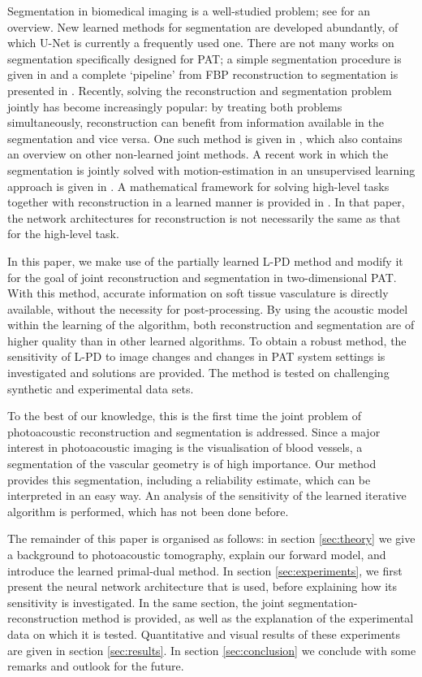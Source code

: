 \documentclass[journal]{IEEEtran}
\newcommand{\hl}[1]{#1}
\begin{document}
Segmentation in biomedical imaging is a well-studied problem; see \cite{Acton2009} for an overview. New learned methods for segmentation are developed abundantly, of which U-Net \cite{Ronneberger2015} is currently a frequently used one. There are not many works on segmentation specifically designed for PAT; a simple segmentation procedure is given in \cite{Soetikno2012} and a complete `pipeline' from FBP reconstruction to segmentation is presented in \cite{Raumonen2018}. Recently, solving the reconstruction and segmentation problem jointly has become increasingly popular: by treating both problems simultaneously, reconstruction can benefit from information available in the segmentation and vice versa. One such method is given in \cite{Corona2018}, which also contains an overview on other non-learned joint methods. A recent work in which the segmentation is jointly solved with motion-estimation in an unsupervised learning approach is given in \cite{Qin2018}. \hl{A mathematical framework for solving high-level tasks together with reconstruction in a learned manner is provided in \cite{Adler2018b}. In that paper, the network architectures for reconstruction is not necessarily the same as that for the high-level task. }

In this paper, we make use of the partially learned L-PD method and modify it for the goal of joint reconstruction and segmentation in {two-dimensional} PAT. With this method, accurate information on soft tissue vasculature is directly available, without the necessity for post-processing. By using the acoustic model within the learning of the algorithm, both reconstruction and segmentation are of higher quality than in other learned algorithms. To obtain a robust method, the sensitivity of L-PD to image changes and changes in PAT system settings is investigated and solutions are provided. The method is tested on challenging synthetic and experimental data sets. 

To the best of our knowledge, this is the first time the joint problem of photoacoustic reconstruction and segmentation is addressed. Since a major interest in photoacoustic imaging is the visualisation of blood vessels, a segmentation of the vascular geometry is of high importance. Our method provides this segmentation, including a reliability estimate, which can be interpreted in an easy way. An analysis of the sensitivity of the learned iterative algorithm is performed, which has not been done before.

The remainder of this paper is organised as follows: in section \ref{sec:theory} we give a background to photoacoustic tomography, explain our forward model, and introduce the learned primal-dual method. In section \ref{sec:experiments}, we first present the neural network architecture that is used, before explaining how its sensitivity is investigated. In the same section, the joint segmentation-reconstruction method is provided, as well as the explanation of the experimental data on which it is tested. Quantitative and visual results of these experiments are given in section \ref{sec:results}. In section \ref{sec:conclusion} we conclude with some remarks and outlook for the future.
\end{document}
